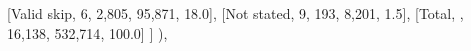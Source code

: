 \documentclass[
  11pt,
  a4paper,
]{article}
\newenvironment{Shaded}{\begin{snugshade}}{\end{snugshade}}
\newcommand{\NormalTok}[1]{\textcolor[rgb]{0.00,0.23,0.31}{#1}}
\newcommand{\StringTok}[1]{\textcolor[rgb]{0.13,0.47,0.30}{#1}}
\begin{document}
\begin{Shaded}
\begin{Highlighting}[]
\NormalTok{                    [}\StringTok{\textquotesingle{}Valid skip\textquotesingle{}}\NormalTok{, }\StringTok{\textquotesingle{}6\textquotesingle{}}\NormalTok{, }\StringTok{\textquotesingle{}2,805\textquotesingle{}}\NormalTok{, }\StringTok{\textquotesingle{}95,871\textquotesingle{}}\NormalTok{, }\StringTok{\textquotesingle{}18.0\textquotesingle{}}\NormalTok{],}
\NormalTok{                    [}\StringTok{\textquotesingle{}Not stated\textquotesingle{}}\NormalTok{, }\StringTok{\textquotesingle{}9\textquotesingle{}}\NormalTok{, }\StringTok{\textquotesingle{}193\textquotesingle{}}\NormalTok{, }\StringTok{\textquotesingle{}8,201\textquotesingle{}}\NormalTok{, }\StringTok{\textquotesingle{}1.5\textquotesingle{}}\NormalTok{],}
\NormalTok{                    [}\StringTok{\textquotesingle{}Total\textquotesingle{}}\NormalTok{, }\StringTok{\textquotesingle{}\textquotesingle{}}\NormalTok{, }\StringTok{\textquotesingle{}16,138\textquotesingle{}}\NormalTok{, }\StringTok{\textquotesingle{}532,714\textquotesingle{}}\NormalTok{, }\StringTok{\textquotesingle{}100.0\textquotesingle{}}\NormalTok{]}
\NormalTok{                ]}
\NormalTok{            ),}
            

\end{Highlighting}
\end{Shaded}
\end{document}
